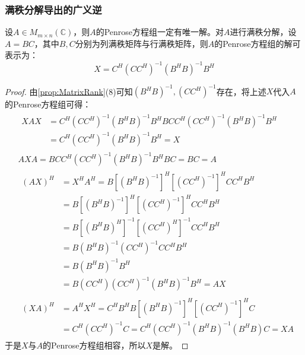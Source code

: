 \subsubsection{满秩分解导出的广义逆}
\begin{theorem}
	设$A\in M_{m\times n}(\mathbb{C})$，则$A$的Penrose方程组一定有唯一解。对$A$进行满秩分解，设$A=BC$，其中$B,C$分别为列满秩矩阵与行满秩矩阵，则$A$的Penrose方程组的解可表示为：
	\begin{equation*}
		X=C^H(CC^H)^{-1}(B^HB)^{-1}B^H
	\end{equation*}
\end{theorem}
\begin{proof}
	由\cref{prop:MatrixRank}(8)可知$(B^HB)^{-1},(CC^H)^{-1}$存在，将上述$X$代入$A$的Penrose方程组可得：
	\begin{align*}
		&\begin{aligned}
			XAX
			&=C^H(CC^H)^{-1}(B^HB)^{-1}B^HBCC^H(CC^H)^{-1}(B^HB)^{-1}B^H \\
			&=C^H(CC^H)^{-1}(B^HB)^{-1}B^H=X
		\end{aligned} \\
		&AXA=BCC^H(CC^H)^{-1}(B^HB)^{-1}B^HBC=BC=A \\
		&\begin{aligned}
			(AX)^H
			&=X^HA^H=B[(B^HB)^{-1}]^H[(CC^H)^{-1}]^HCC^HB^H \\
			&=B[(B^HB)^{-1}]^H[(CC^H)^{-1}]^HCC^HB^H \\
			&=B[(B^HB)^H]^{-1}[(CC^H)^H]^{-1}CC^HB^H \\
			&=B(B^HB)^{-1}(CC^H)^{-1}CC^HB^H \\
			&=B(B^HB)^{-1}B^H \\
			&=B(CC^H)(CC^H)^{-1}(B^HB)^{-1}B^H=AX
		\end{aligned} \\
		&\begin{aligned}
			(XA)^H
			&=A^HX^H=C^HB^HB[(B^HB)^{-1}]^H[(CC^H)^{-1}]^HC \\
			&=C^H(CC^H)^{-1}C=C^H(CC^H)^{-1}(B^HB)^{-1}(B^HB)C=XA
		\end{aligned}
	\end{align*}
	于是$X$与$A$的Penrose方程组相容，所以$X$是解。
\end{proof}
